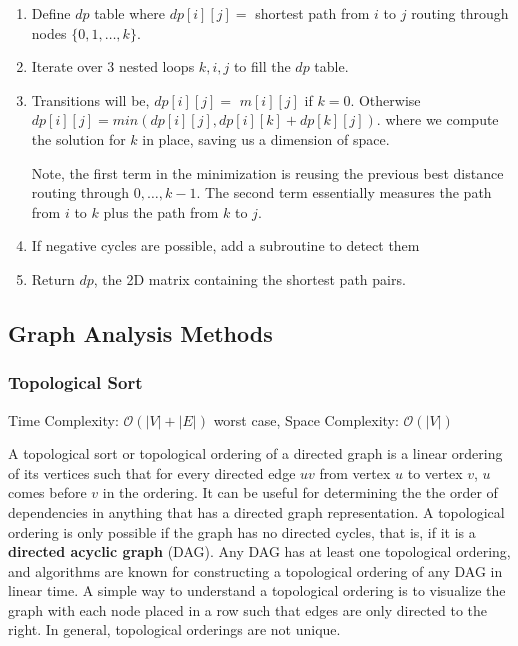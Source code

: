 \documentclass{article}
\newcommand{\bigO}{\mathcal{O}}
\begin{document}
    \begin{enumerate}
        \item Define $dp$ table where $dp[i][j] =$ shortest path from $i$ to $j$ routing through nodes $\{ 0, 1, \dots, k \}$.
    
        \item Iterate over 3 nested loops $k,i,j$ to fill the $dp$ table.
        
        \item Transitions will be, $dp[i][j] =$ $m[i][j]$ if $k = 0$. Otherwise $dp[i][j] = min(dp[i][j], dp[i][k] + dp[k][j])$. where we compute the solution for $k$ in place, saving us a  dimension of space.
        
        Note, the first term in the minimization is reusing the previous best distance routing through $0, \dots, k-1$. The second term essentially measures the path from $i$ to $k$ plus the path from $k$ to $j$. 
        
        \item If negative cycles are possible, add a subroutine to detect them
        
        \item Return $dp$, the 2D matrix containing the shortest path pairs.
    \end{enumerate}
     
    \subsection{Graph Analysis Methods}
    \subsubsection{Topological Sort}
    Time Complexity: $\bigO(|V| + |E|)$ worst case,  Space Complexity: $\bigO(|V|)$
    
    A topological sort or topological ordering of a directed graph is a linear ordering of its vertices such that for every directed edge $uv$ from vertex $u$ to vertex $v$, $u$ comes before $v$ in the ordering. It can be useful for determining the  the order of dependencies in anything that has a directed graph representation. A topological ordering is only possible if the graph has no directed cycles, that is, if it is a \textbf{directed acyclic graph} (DAG). Any DAG has at least one topological ordering, and algorithms are known for constructing a topological ordering of any DAG in linear time. A simple way to understand a topological ordering is to visualize the graph with each node placed in a row such that edges are only directed to the right. In general, topological orderings are not unique.
    
\end{document}

